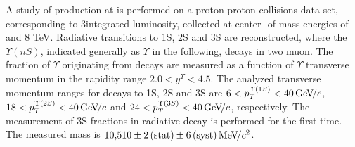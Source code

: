 A study of \chib production at \lhcb is performed on a proton-proton collisions
data set, corresponding to 3\invfb integrated luminosity, collected at center-
of-mass energies of  and 8 TeV. Radiative \chib transitions to
\Y1S, \Y2S and \Y3S are reconstructed, where the $\Upsilon(nS)$, indicated generally as $\Upsilon$ in the following, decays in two muon. 
The fraction of $\Upsilon$ originating from \chib decays
are measured as a function of $\Upsilon$ transverse momentum in the \lhcb rapidity range
$2.0 < y^{\Upsilon} < 4.5$. The analyzed transverse momentum ranges for decays
to \Y1S, \Y2S and \Y3S are $6<p_T^{\Y1S}<40\gevc$, $18<p_T^{\Y2S}<40\gevc$ and
$24<p_T^{\Y3S}<40\gevc$, respectively. The measurement of
\Y3S fractions in radiative \chibThreeP decay is performed for the first time.
The measured \chiboneThreeP mass is $10{,}510 \pm 2\mathrm{\,(stat)} \pm
6\mathrm{\,(syst)} {\mathrm{\,Me\kern -0.1em V\!/}c^2}$.

